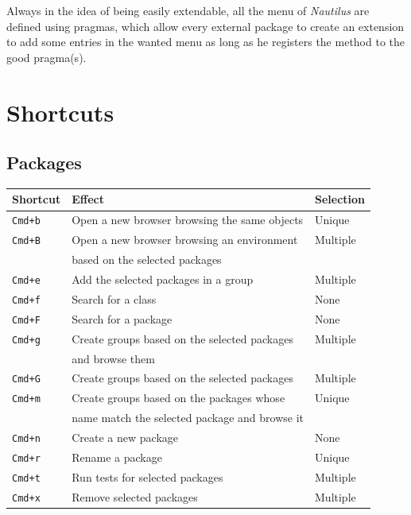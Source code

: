 \documentclass[a4paper,10pt,twoside]{book}
\newcommand\nautilus{\emph{Nautilus}\xspace}
\begin{document}
Always in the idea of being easily extendable, all the menu of \nautilus are defined using pragmas, which allow every external package to create an extension to add some entries in the wanted menu as long as he registers the method to the good pragma(s).

\section{Shortcuts}\label{sec:shortcuts}
\subsection{Packages}


\begin{tabular}{l | l | l}
Shortcut & Effect & Selection\\
\hline
\hline
\verb?Cmd+b? & Open a new browser browsing the same objects & Unique\\
\hline
\verb?Cmd+B?& Open a new browser browsing an environment & Multiple\\
 &based on the selected packages & \\
\hline
\verb?Cmd+e? & Add the selected packages in a group& Multiple\\
\hline
\verb?Cmd+f? &  Search for a class& None\\
\hline
\verb?Cmd+F? & Search for a package& None\\
\hline
\verb?Cmd+g? & Create groups based on the selected packages & Multiple\\
&and browse them&\\
\hline
\verb?Cmd+G? & Create groups based on the selected packages&Multiple\\
\hline
\verb?Cmd+m? & Create groups based on the packages whose & Unique\\
        & name match the selected package and browse it &  \\
\hline
\verb?Cmd+n? & Create a new package&None\\
\hline
\verb?Cmd+r? & Rename a package&Unique\\
\hline
\verb?Cmd+t? & Run tests for selected packages&Multiple\\
\hline
\verb?Cmd+x? & Remove selected packages&Multiple\\
\hline
\end{tabular}
\end{document}
